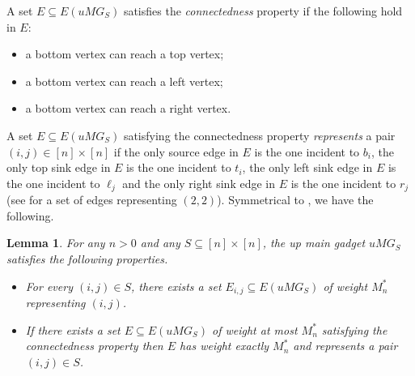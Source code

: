 \documentclass[a4paper,11pt]{article}
\theoremstyle{plain}
\newtheorem{lemma}[theorem]{Lemma}
\newtheorem{identification rule}{Identification Rule}
\theoremstyle{definition}
\theoremstyle{remark}
\begin{document}
\noindent
A set $E \subseteq E(uMG_S)$ satisfies the \emph{connectedness} property if the following hold in $E$: 
\begin{itemize}
\item a bottom vertex can reach a top vertex;
\item a bottom vertex can reach a left vertex;
\item a bottom vertex can reach a right vertex.
\end{itemize}
A set $E \subseteq E(uMG_S)$ satisfying the connectedness property \emph{represents} a pair $(i,j) \in [n] \times [n]$ if the only source edge in $E$ is the one incident to $b_i$, the only top sink edge in $E$ is the one incident to $t_i$, the only left sink edge in $E$ is the one incident to $\ell_j$ and the only right sink edge in $E$ is the one incident to $r_j$ (see  for a set of edges representing $(2,2)$). Symmetrical to , we have the following.

\begin{lemma}
\label{lem:umg}
For any $n > 0$ and any $S \subseteq [n] \times [n]$, the up main gadget $uMG_S$ satisfies the following properties.
\begin{itemize}
\item[(1)] For every $(i,j) \in S$, there exists a set $E_{i,j} \subseteq E(uMG_S)$ of weight $M_n^*$ representing $(i,j)$.
\item[(2)] If there exists a set $E \subseteq E(uMG_S)$ of weight at most $M_n^*$ satisfying the connectedness property then $E$ has weight exactly $M_n^*$ and represents a pair $(i,j) \in S$.
\end{itemize}
\end{lemma}

\end{document}

